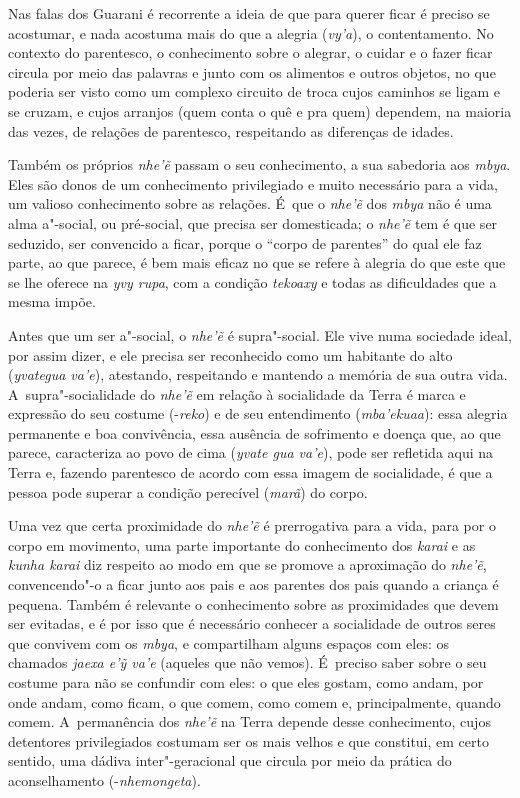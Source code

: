 Nas falas dos Guarani é recorrente a ideia de que para querer ficar é
preciso se acostumar, e nada acostuma mais do que a alegria (\emph{vy’a}), o
contentamento. No contexto do parentesco, o conhecimento sobre o
alegrar, o cuidar e o fazer ficar circula por meio das palavras e junto
com os alimentos e outros objetos, no que poderia ser visto como um
complexo circuito de troca cujos caminhos se ligam e se cruzam, e cujos
arranjos (quem conta o quê e pra quem) dependem, na maioria das vezes,
de relações de parentesco, respeitando as diferenças de idades.

Também os próprios \emph{nhe’ẽ} passam o seu conhecimento, a sua
sabedoria aos \emph{mbya}. Eles são donos de um conhecimento privilegiado e
muito necessário para a vida, um valioso conhecimento sobre as
relações. É~que o \emph{nhe’ẽ} dos \emph{mbya} não é uma alma a"-social, ou
pré-social, que precisa ser domesticada; o \emph{nhe’ẽ} tem é que ser
seduzido, ser convencido a ficar, porque o ``corpo de parentes'' do qual
ele faz parte, ao que parece, é bem mais eficaz no que se refere à
alegria do que este que se lhe oferece na \emph{yvy rupa}, com a condição
\emph{tekoaxy} e todas as dificuldades que a mesma impõe.

Antes que um ser a"-social, o \emph{nhe’ẽ} é supra"-social. Ele vive numa
sociedade ideal, por assim dizer, e ele precisa ser reconhecido como um
habitante do alto (\emph{yvategua va’e}), atestando, respeitando e mantendo a
memória de sua outra vida. A~supra"-socialidade do \emph{nhe’ẽ} em
relação à socialidade da Terra é marca e expressão do seu costume
(-\emph{reko}) e de seu entendimento (\emph{mba’ekuaa}): essa alegria permanente e
boa convivência, essa ausência de sofrimento e doença que, ao que
parece, caracteriza ao povo de cima (\emph{yvate gua va’e}), pode ser
refletida aqui na Terra e, fazendo parentesco de acordo com essa imagem
de socialidade, é que a pessoa pode superar a condição perecível (\emph{marã})
do corpo.

Uma vez que certa proximidade do \emph{nhe’ẽ} é prerrogativa para a vida,
para por o corpo em movimento, uma parte importante do conhecimento dos
\emph{karai} e as \emph{kunha karai} diz respeito ao modo em que se promove a
aproximação do \emph{nhe’ẽ}, convencendo"-o a ficar junto aos pais e aos
parentes dos pais quando a criança é pequena. Também é relevante o
conhecimento sobre as proximidades que devem ser evitadas, e é por isso
que é necessário conhecer a socialidade de outros seres que convivem
com os \emph{mbya}, e compartilham alguns espaços com eles: os chamados \emph{jaexa
e’ỹ va’e} (aqueles que não vemos). É~preciso saber sobre o seu
costume para não se confundir com eles: o que eles gostam, como andam,
por onde andam, como ficam, o que comem, como comem e, principalmente,
quando comem. A~permanência dos \emph{nhe’ẽ} na Terra depende desse
conhecimento, cujos detentores privilegiados costumam ser os mais
velhos e que constitui, em certo sentido, uma dádiva inter"-geracional
que circula por meio da prática do aconselhamento (-\emph{nhemongeta}).

